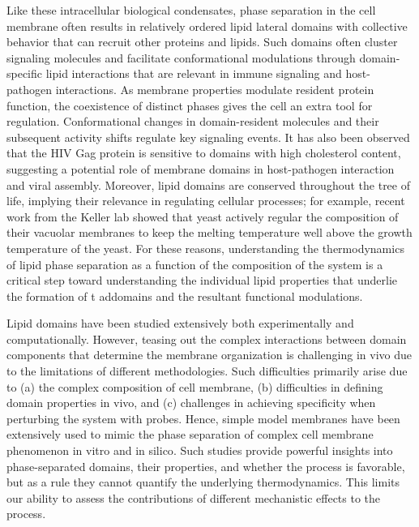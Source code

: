 \documentclass{biophys-new}
\begin{document}
Like these intracellular biological condensates, phase separation in the cell membrane often results in relatively ordered lipid lateral domains with collective behavior that can recruit other proteins and lipids\cite{Sezgin2017, Case2019}.
Such domains often cluster signaling molecules\cite{Tian2007} and facilitate conformational modulations through domain-specific lipid interactions\cite{Laganowsky2014,Lingwood2011} that are relevant in immune signaling\cite{Beck-garcia2015,Wisser2017} and host-pathogen interactions\cite{Dick2012}.
As membrane properties modulate resident protein function, the coexistence of distinct phases gives the cell an extra tool for regulation.
Conformational changes in domain-resident molecules and their subsequent activity shifts regulate key signaling events\cite{Laganowsky2014,Lingwood2011}.
It has also been observed that the HIV Gag protein is sensitive to domains with high cholesterol content, suggesting a potential role of membrane domains in host-pathogen interaction and viral assembly\cite{Dick2012}.
Moreover, lipid domains are conserved throughout the tree of life, implying their relevance in regulating cellular processes\cite{Sezgin2017}; for example, recent work from the Keller lab showed that yeast actively regular the composition of their vacuolar membranes to keep the melting temperature well above the growth temperature of the yeast\cite{Keller2022}.
For these reasons, understanding the thermodynamics of lipid phase separation as a function of the composition of the system is a critical step toward understanding the individual lipid properties that underlie the formation of t addomains and the resultant functional modulations. 


Lipid domains have been studied extensively both experimentally and computationally.
However, teasing out the complex interactions between domain components that determine the membrane organization is challenging in vivo due to the limitations of different methodologies\cite{Klotzsch2013}.
Such difficulties primarily arise due to (a) the complex composition of cell membrane\cite{Tieleman2019}, (b) difficulties in defining domain properties in vivo\cite{Sezgin2017}, and (c) challenges in achieving specificity when perturbing the system with probes\cite{Veatch2007}.
Hence, simple model membranes have been extensively used to mimic the phase separation of complex cell membrane phenomenon in vitro\cite{Veatch2003a,Veatch2002,Veatch2003} and in silico\cite{Risselada2008,Lin2016,Lin2019}.
Such studies provide powerful insights into phase-separated domains, their properties, and whether the process is favorable, but as a rule they cannot quantify the underlying thermodynamics. This limits our ability to assess the contributions of different mechanistic effects to the process.
\end{document}
